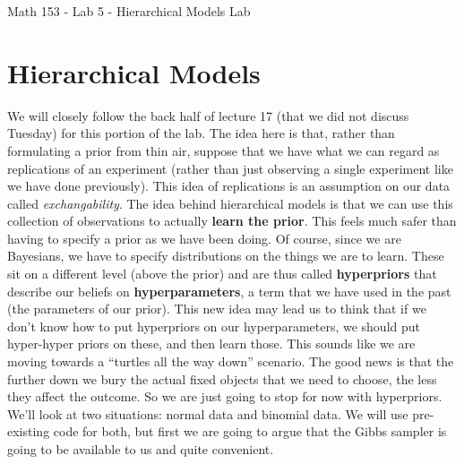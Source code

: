 \documentclass{article}
\begin{document}
\centerline{Math 153 - Lab 5 - Hierarchical Models Lab}
\vspace{.1in}
\section{Hierarchical Models}
We will closely follow the back half of lecture 17 (that we did not discuss Tuesday) for this portion of the lab.  The idea here is that, rather than formulating a prior from thin air, suppose that we have what we can regard as replications of an experiment (rather than just observing a single experiment like we have done previously).  This idea of replications is an assumption on our data called {\it exchangability}. The idea behind hierarchical models is that we can use this collection of observations to actually {\bf learn the prior}.  This feels much safer than having to specify a prior as we have been doing.  Of course, since we are Bayesians, we have to specify distributions on the things we are to learn.  These sit on a different level (above the prior) and are thus called {\bf hyperpriors} that describe our beliefs on {\bf hyperparameters}, a term that we have used in the past (the parameters of our prior).  This new idea may lead us to think that if we don't know how to put hyperpriors on our hyperparameters, we should put hyper-hyper priors on these, and then learn those.  This sounds like we are moving towards a ``turtles all the way down'' scenario.  The good news is that the further down we bury the actual fixed objects that we need to choose, the less they affect the outcome.  So we are just going to stop for now with hyperpriors.\\

We'll look at two situations: normal data and binomial data. We will use pre-existing code for both, but first we are going to argue that the Gibbs sampler is going to be available to us and quite convenient.
\end{document}

